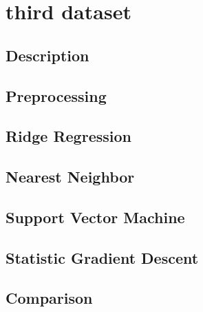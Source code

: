 \section{third dataset}
\subsection{Description}
\subsection{Preprocessing}
\subsection{Ridge Regression}
\subsection{Nearest Neighbor}
\subsection{Support Vector Machine}
\subsection{Statistic Gradient Descent}
\subsection{Comparison}
